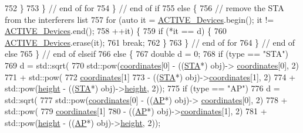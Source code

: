 \begin{DoxyCode}
{{{752                 \}
753             \} \textcolor{comment}{// end of for}
754         \} \textcolor{comment}{// end of if}
755         \textcolor{keywordflow}{else} \{
756             \textcolor{comment}{// remove the STA from the interferers list}
757             \textcolor{keywordflow}{for} (\textcolor{keyword}{auto} it = \hyperlink{classAP_ab6dd8d2144b1be8dea239c3d76fc60cd}{ACTIVE\_Devices}.begin(); it != 
      \hyperlink{classAP_ab6dd8d2144b1be8dea239c3d76fc60cd}{ACTIVE\_Devices}.end();
758                     ++it) \{
759                 \textcolor{keywordflow}{if} (*it == d) \{
760                     \hyperlink{classAP_ab6dd8d2144b1be8dea239c3d76fc60cd}{ACTIVE\_Devices}.erase(it);
761                     \textcolor{keywordflow}{break};
762                 \}
763             \} \textcolor{comment}{// end of for}
764         \} \textcolor{comment}{// end of else}
765     \} \textcolor{comment}{// end of elseif}
766     \textcolor{keywordflow}{else} \{
767         \textcolor{keywordtype}{double} d = 0;
768         \textcolor{keywordflow}{if} (type == \textcolor{stringliteral}{"STA"})
769             d = std::sqrt(
770                     std::pow(\hyperlink{classAP_ac52816d18c4dc26158fa3bd2e63f3bcc}{coordinates}[0] - ((\hyperlink{classSTA}{STA}*) obj)->
      \hyperlink{classAP_ac52816d18c4dc26158fa3bd2e63f3bcc}{coordinates}[0], 2)
771                             + std::pow(
772                                     \hyperlink{classAP_ac52816d18c4dc26158fa3bd2e63f3bcc}{coordinates}[1]
773                                             - ((\hyperlink{classSTA}{STA}*) obj)->\hyperlink{classAP_ac52816d18c4dc26158fa3bd2e63f3bcc}{coordinates}[1], 2)
774                             + std::pow(\hyperlink{classAP_a27fec97f7b61e45d1350555cf62535d4}{height} - ((\hyperlink{classSTA}{STA}*) obj)->\hyperlink{classAP_a27fec97f7b61e45d1350555cf62535d4}{height}, 2));
775         \textcolor{keywordflow}{if} (type == \textcolor{stringliteral}{"AP"})
776             d = std::sqrt(
777                     std::pow(\hyperlink{classAP_ac52816d18c4dc26158fa3bd2e63f3bcc}{coordinates}[0] - ((\hyperlink{classAP}{AP}*) obj)->
      \hyperlink{classAP_ac52816d18c4dc26158fa3bd2e63f3bcc}{coordinates}[0], 2)
778                             + std::pow(
779                                     \hyperlink{classAP_ac52816d18c4dc26158fa3bd2e63f3bcc}{coordinates}[1]
780                                             - ((\hyperlink{classAP}{AP}*) obj)->\hyperlink{classAP_ac52816d18c4dc26158fa3bd2e63f3bcc}{coordinates}[1], 2)
781                             + std::pow(\hyperlink{classAP_a27fec97f7b61e45d1350555cf62535d4}{height} - ((\hyperlink{classAP}{AP}*) obj)->\hyperlink{classAP_a27fec97f7b61e45d1350555cf62535d4}{height}, 2));
}}}
\end{DoxyCode}

